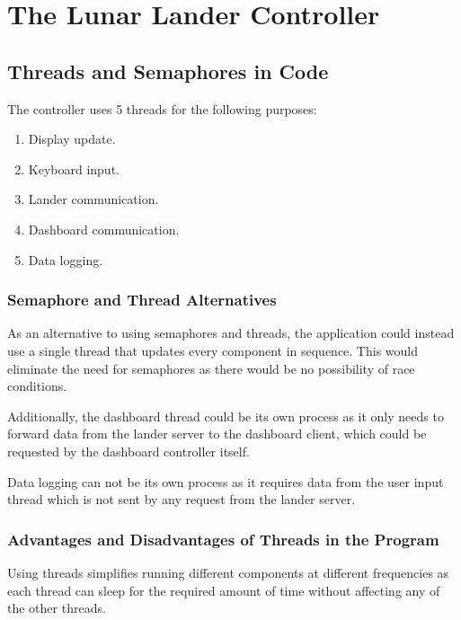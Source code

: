 \documentclass{article}
\begin{document}
\section{The Lunar Lander Controller}{
    \renewcommand{\thesubsection}{\thesection.\alph{subsection}}

    \subsection{Threads and Semaphores in Code}
        The controller uses 5 threads for the following purposes:
        \begin{enumerate}
            \item Display update.
            \item Keyboard input.
            \item Lander communication.
            \item Dashboard communication.
            \item Data logging.
        \end{enumerate}

        \subsubsection{Semaphore and Thread Alternatives}

        As an alternative to using semaphores and threads, the application could instead
        use a single thread that updates every component in sequence. This would eliminate
        the need for semaphores as there would be no possibility of race conditions.

        Additionally, the dashboard thread could be its own process as it only needs to forward data
        from the lander server to the dashboard client, which could be requested by the dashboard controller itself.

        Data logging can not be its own process as it requires data from the user input thread which is
        not sent by any request from the lander server.

        \subsubsection{Advantages and Disadvantages of Threads in the Program}
        Using threads simplifies running different components at different frequencies as each thread can
        sleep for the required amount of time without affecting any of the other threads.

}
\end{document}
